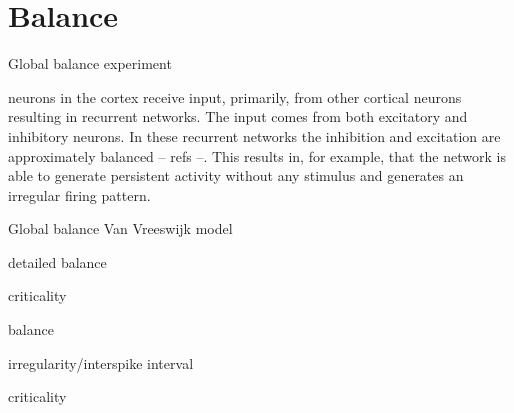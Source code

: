 \section{Balance}
Global balance experiment

neurons in the cortex receive input, primarily, from other cortical neurons resulting in recurrent networks. The input comes from both excitatory and inhibitory neurons. In these recurrent networks the  inhibition and excitation are approximately balanced -- refs --. This results in, for example, that the network is able to generate persistent activity without any stimulus and generates an irregular firing pattern.



Global balance Van Vreeswijk model

detailed balance 


criticality



balance

irregularity/interspike interval

criticality 
